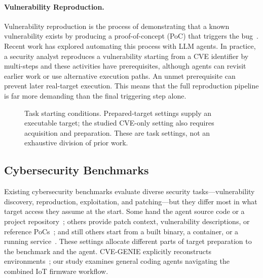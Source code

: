 \paragraph{Vulnerability Reproduction.}
Vulnerability reproduction is the process of demonstrating that a known vulnerability exists by producing a proof-of-concept (PoC) that triggers the bug~\cite{cybergym}. Recent work has explored automating this process with LLM agents\cite{liu2026cve2poc,zhao2025systematic, krepro}.
In practice, a security analyst reproduces a vulnerability starting from a CVE identifier by multi-steps and these activities have prerequisites, although agents can revisit earlier work or use alternative execution paths. An unmet prerequisite can prevent later real-target execution. This means that the full reproduction pipeline is far more demanding than the final triggering step alone.


\begin{figure}[t]
    \centering
    
    \caption{Task starting conditions. Prepared-target settings supply an executable target; the studied CVE-only setting also requires acquisition and preparation. These are task settings, not an exhaustive division of prior work.}
    \label{fig:iceberg}
\end{figure}

\subsection{Cybersecurity Benchmarks}
Existing cybersecurity benchmarks evaluate diverse security tasks---vulnerability discovery, reproduction, exploitation, and patching---but they differ most in what target access they assume at the start.
Some hand the agent source code or a project repository~\cite{cybergym,secbench,cvebench,bountybench}; others provide patch context, vulnerability descriptions, or reference PoCs~\cite{krepro,secbench}; and still others start from a built binary, a container, or a running service~\cite{exploitbench,exploitgym,cybergyme2e}.
These settings allocate different parts of target preparation to the benchmark and the agent. CVE-GENIE explicitly reconstructs environments~\cite{cvegenie}; our study examines general coding agents navigating the combined IoT firmware workflow.

